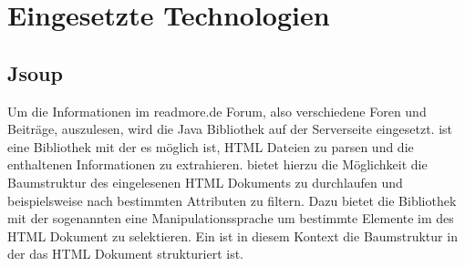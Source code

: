 \section{Eingesetzte Technologien}
\subsection{Jsoup}
Um die Informationen im readmore.de Forum, also verschiedene Foren und Beiträge,
auszulesen, wird die Java Bibliothek  auf der
Serverseite eingesetzt.
 ist eine Bibliothek mit der es möglich ist, HTML Dateien zu
parsen und die enthaltenen Informationen zu extrahieren. 
bietet hierzu die Möglichkeit die Baumstruktur des eingelesenen HTML Dokuments
zu durchlaufen und beispielsweise nach bestimmten Attributen zu filtern. Dazu
bietet die Bibliothek mit der sogenannten  eine
Manipulationssprache um bestimmte Elemente im  des HTML
Dokument zu selektieren. Ein  ist in diesem Kontext die 
Baumstruktur in der das HTML Dokument strukturiert ist. \\
